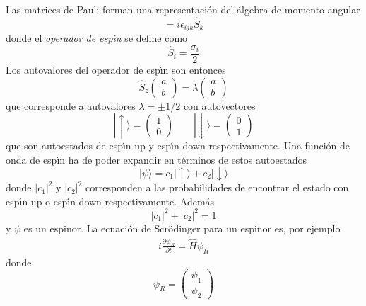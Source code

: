 Las matrices de Pauli forman una representaci\'on del \'algebra de momento angular
\begin{equation}
  [\hat S_i,\hat S_j]=i\epsilon_{ijk}\hat S_k
\end{equation}
donde el \emph{operador de esp\'\i n} se define como
\begin{equation}
  \hat S_i=\frac{\sigma_i}{2}
\end{equation}
Los autovalores del operador de esp\'\i n son entonces
\begin{equation}
  \hat S_z
  \begin{pmatrix}
    a\\
    b
  \end{pmatrix}=\lambda
  \begin{pmatrix}
    a\\
    b
  \end{pmatrix}
\end{equation}
que corresponde a autovalores $\lambda=\pm1/2$ con autovectores 
\begin{equation}
  |\uparrow\rangle=\begin{pmatrix}
    1\\
    0
  \end{pmatrix}\qquad
  |\downarrow\rangle=\begin{pmatrix}
    0\\
    1
  \end{pmatrix}
\end{equation}
que son autoestados de esp\'\i n up y esp\'\i n down respectivamente. Una funci\'on de onda de esp\'\i n ha de poder expandir en t\'erminos de estos autoestados
\begin{equation}
  |\psi\rangle=c_1|\uparrow\rangle+c_2|\downarrow\rangle
\end{equation}
donde $|c_1|^2$ y $|c_2|^2$ corresponden a las probabilidades de encontrar el estado con esp\'\i n up o esp\'\i n down respectivamente. Adem\'as
\begin{equation}
  |c_1|^2+|c_2|^2=1
\end{equation}
y $\psi$ es un espinor. La ecuaci\'on de Scr\"odinger para un espinor es, por ejemplo
\begin{align}
  i\frac{\partial\psi_R}{\partial t}=\widehat{H}\psi_R
\end{align}
donde
\begin{equation}
  \psi_R=
  \begin{pmatrix}
    \psi_1\\
    \psi_2
  \end{pmatrix}
\end{equation}
